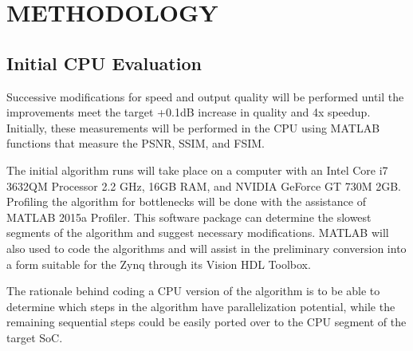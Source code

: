 
\chapter{METHODOLOGY} %

\label{Chapter4} %





\section{Initial CPU Evaluation}

Successive modifications for speed and output quality will be performed until the improvements meet the target +0.1dB increase in quality and 4x speedup.
Initially, these measurements will be performed in the CPU using MATLAB functions that measure the PSNR, SSIM, and FSIM.

The initial algorithm runs will take place on a computer with an Intel Core i7 3632QM Processor 2.2 GHz, 16GB RAM, and NVIDIA GeForce GT 730M 2GB. 
Profiling the algorithm for bottlenecks will be done with the assistance of MATLAB 2015a Profiler. 
This software package can determine the slowest segments of the algorithm and suggest necessary modifications.
MATLAB will also used to code the algorithms and will assist in the preliminary conversion into a form suitable for the Zynq through its Vision HDL Toolbox.

The rationale behind coding a CPU version of the algorithm is to be able to determine which steps in the algorithm have parallelization potential, while the remaining sequential steps could be easily ported over to the CPU segment of the target SoC.

